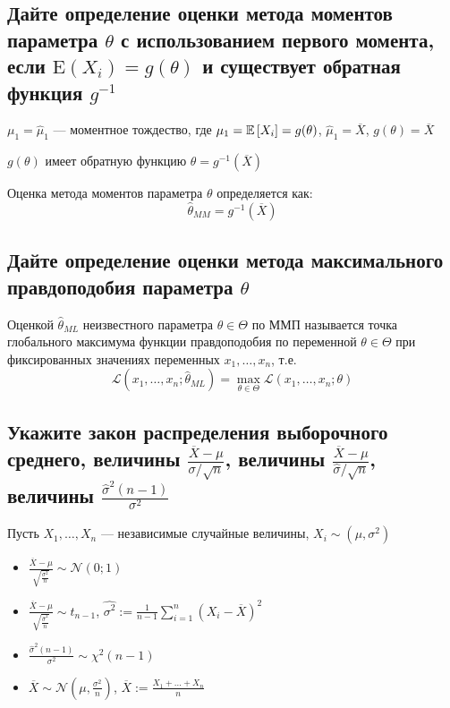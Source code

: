 \documentclass{article}
\begin{document}
\subsection{Дайте определение оценки метода моментов параметра $\theta$ с использованием первого момента, если $\mathrm{E}\left(X_{i}\right)=g(\theta)$ и существует обратная функция $g^{-1}$}
$\mu_1=\widehat{\mu}_1$ — моментное тождество, где $\mu_1=\mathbb{E}\left[X_i\right]=g(\theta)$, $\widehat{\mu}_1=\overline{X}$, $g(\theta)=\overline{X}$

$g(\theta)$ имеет обратную функцию $\theta=g^{-1}(\overline{X})$

 Оценка метода моментов параметра $\theta$ определяется как:
\begin{equation*}
    \hat{\theta}_{MM} = g^{-1}\left( \overline{X} \right)
\end{equation*}

\subsection{Дайте определение оценки метода максимального правдоподобия параметра $\theta$}
 Оценкой $\hat{\theta}_{ML}$ неизвестного параметра $\theta \in \Theta$ по ММП называется точка глобального максимума функции правдоподобия по переменной $\theta \in \Theta$ при фиксированных значениях переменных $x_{1}, \ldots, x_{n}$, т.е.
\begin{equation*}
    \mathcal{L}\left(x_{1}, \ldots, x_{n} ; \hat{\theta}_{ML}\right)=\max _{\theta \in \Theta} \mathcal{L}\left(x_{1}, \ldots, x_{n} ; \theta\right)
\end{equation*}

\subsection{Укажите закон распределения выборочного среднего, величины $\frac{\overline{X}-\mu}{\sigma / \sqrt{n}}$, величины $\frac{\overline{X}-\mu}{\hat{\sigma} / \sqrt{n}}$, величины $\frac{\hat{\sigma}^{2}(n-1)}{\sigma^{2}}$}
Пусть $X_{1}, \ldots, X_{n}$ — независимые случайные величины, $X_i\sim(\mu,\sigma^2)$%
\begin{itemize}
    \item $\frac{\overline{X}-\mu}{\sqrt{\frac{\sigma^2}{n}}}\sim\mathcal{N}(0;1)$
    \item $\frac{\overline{X}-\mu}{\sqrt{\frac{\hat{\sigma}^2}{n}}}\sim t_{n-1}$, $\widehat{\sigma^{2}}:=\frac{1}{n-1} \sum_{i=1}^{n}\left(X_{i}-\overline{X}\right)^{2}$
    \item $\frac{\hat{\sigma}^{2}(n-1)}{\sigma^{2}} \sim \chi^{2}(n-1)$
    \item $\overline{X} \sim \mathcal{N}\left(\mu, \frac{\sigma^2}{n} \right)$, $\overline{X}:=\frac{X_{1}+\ldots+X_{n}}{n}$
\end{itemize}
\end{document}
